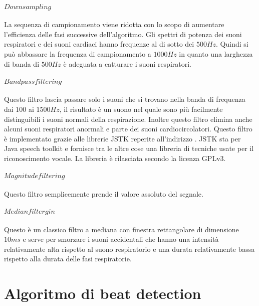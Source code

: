       \paragraph{$Downsampling$}
	La sequenza di campionamento viene ridotta con lo scopo di aumentare l'efficienza delle fasi successive dell'algoritmo. 
	Gli spettri di potenza dei suoni respiratori e dei suoni cardiaci hanno frequenze al di sotto dei $500Hz$. 
	Quindi si pu\`o abbassare la frequenza di campionamento a $1000Hz$ in quanto una larghezza di banda di $500Hz$ \`e adeguata a catturare i suoni respiratori\cite{ASPODUOCSS}. 
      \paragraph{$Bandpass filtering$}
	Questo filtro lascia passare solo i suoni che si trovano nella banda di frequenza dai $100$ ai $1500Hz$, il risultato \`e un suono nel quale sono pi\`u facilmente distinguibili i suoni normali della respirazione. 
	Inoltre questo filtro elimina anche alcuni suoni respiratori anormali e parte dei suoni cardiocircolatori.
	Questo filtro \`e implementato grazie alle librerie JSTK reperite all'indirizzo \cite{jstk}. 
	JSTK sta per Java speech toolkit e fornisce tra le altre cose una libreria di tecniche usate per il riconoscimento vocale. 
	La libreria \`e rilasciata secondo la licenza GPLv3.
      \paragraph{$Magnitude filtering$}
	Questo filtro semplicemente prende il valore assoluto del segnale.
      \paragraph{$Median filtergin$}
	Questo \`e un classico filtro a mediana con finestra rettangolare di dimensione $10ms$ e serve per smorzare i suoni accidentali che hanno una intensit\`a relativamente alta rispetto al suono respiratorio e una durata relativamente bassa rispetto alla durata delle fasi respiratorie.

  \section{Algoritmo di beat detection}

